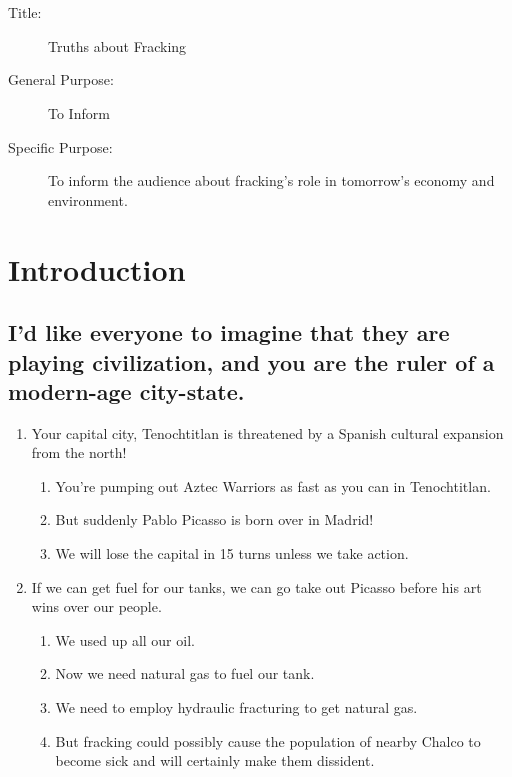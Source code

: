 \documentclass{article}
\begin{document}
\section*{}
  \begin{description}
    \item[Title:] Truths about Fracking
    \item[General Purpose:] To Inform
    \item[Specific Purpose:] To inform the audience about fracking's role in tomorrow's economy and environment.
  \end{description}

\section{Introduction}
  \subsection{I'd like everyone to imagine that they are playing civilization, and you are the ruler of a modern-age city-state.}
    \begin{enumerate}
      \item Your capital city, Tenochtitlan is threatened by a Spanish cultural expansion from the north!
        \begin{enumerate}
          \item You're pumping out Aztec Warriors as fast as you can in Tenochtitlan.                                                     
          \item But suddenly Pablo Picasso is born over in Madrid!
          \item We will lose the capital in 15 turns unless we take action.
        \end{enumerate}
      \item If we can get fuel for our tanks, we can go take out Picasso before his art wins over our people.
        \begin{enumerate}
          \item We used up all our oil.
          \item Now we need natural gas to fuel our tank.
          \item We need to employ hydraulic fracturing to get natural gas.
          \item But fracking could possibly cause the population of nearby Chalco to become sick and will certainly make them dissident.
        \end{enumerate}
    \end{enumerate}
\end{document}

